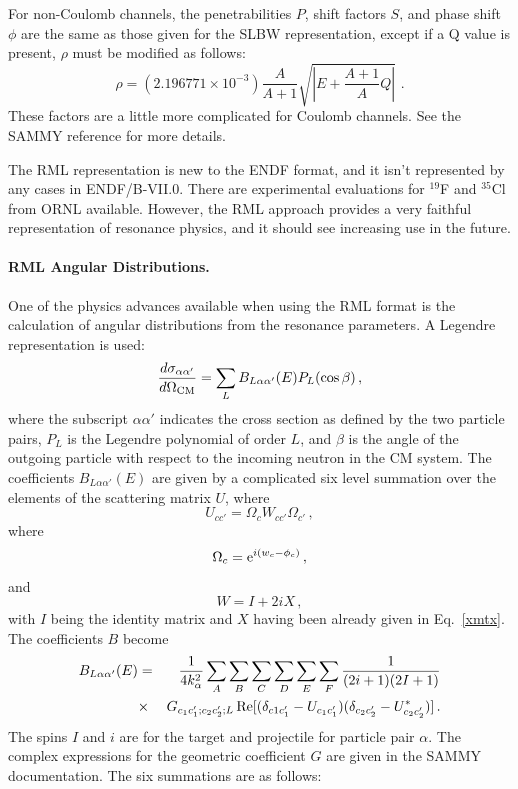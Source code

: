 For non-Coulomb channels, the penetrabilities $P$, shift factors
$S$, and phase shift $\phi$ are the same as those given for
the SLBW representation, except if a Q value is present, $\rho$
must be modified as follows:
\begin{equation}
   \rho=(2.196771{\times}10^{-3}){\frac{A}{A+1}}
     \sqrt{|E+\frac{A+1}{A}Q|}\,\,.
\end{equation}
These factors are a little more complicated for Coulomb channels.
See the SAMMY reference for more details.

The RML representation is new to the ENDF
format, and it isn't represented by any cases in ENDF/B-VII.0.  There are
experimental evaluations for $^{19}$F and $^{35}$Cl from ORNL available.  However, the RML approach provides
a very faithful representation of resonance physics, and it should see
increasing use in the future.

\paragraph{RML Angular Distributions.} One of the physics
advances available when using the RML format is the calculation
of angular distributions from the resonance parameters.
A Legendre representation is used:
\begin{equation}
  \frac{d\sigma_{\alpha\alpha'}}{d\Omega_{\rm CM}}
     =\sum_L B_{L\alpha\alpha'}(E)P_L(\cos\beta) \,,
\end{equation}
where the subscript $\alpha\alpha'$ indicates the cross section
as defined by the two particle pairs, $P_L$ is the Legendre
polynomial of order $L$, and $\beta$ is the angle of the outgoing
particle with respect to the incoming neutron in the CM system.
The coefficients $B_{L\alpha\alpha'}(E)$ are given by a
complicated six level summation over the elements of the
scattering matrix $U$, where
\begin{equation}
   U_{cc'}=\Omega_c W_{cc'} \Omega_{c'} \,,
\end{equation}
where
\begin{equation}
  \Omega_c={\rm e}^{i(w_c-\phi_c)} \,,
\end{equation}
and
\begin{equation}
   W=I+2iX \,,
\end{equation}
with $I$ being the identity matrix and $X$ having been
already given in Eq.~\ref{xmtx}.  The coefficients $B$
become
\begin{eqnarray}
   B_{L\alpha\alpha'}(E)&=&\frac{1}{4k_\alpha^2}
     \sum_A \sum_B \sum_C \sum_D \sum_E \sum_F
    \frac{1}{(2i+1)(2I+1)} \nonumber\\
  &\times& G_{c_1c'_1;c_2c'_2;L}\, {\rm Re}[(\delta_{c1c'_1}
    -U_{c_1c'_1})(\delta_{c_2c'_2}-U^*_{c_2c'_2})] \,.
\end{eqnarray}
The spins $I$ and $i$ are for the target and projectile
for particle pair $\alpha$.  The complex expressions for the
geometric coefficient $G$ are given in the SAMMY documentation.
The six summations are as follows:

